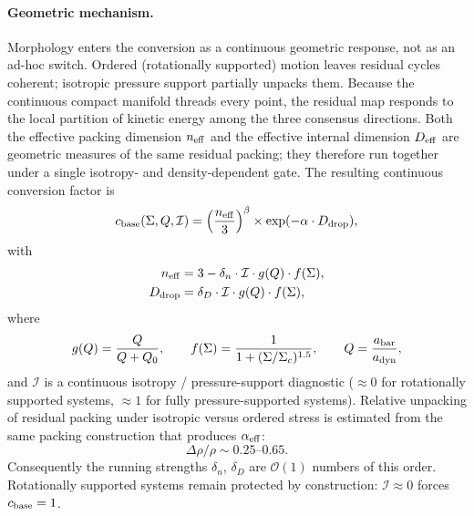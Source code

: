 \documentclass[11pt,a4paper]{article}
\begin{document}
\paragraph{Geometric mechanism.}
Morphology enters the conversion as a continuous geometric response, not as an ad-hoc switch. Ordered (rotationally supported) motion leaves residual cycles coherent; isotropic pressure support partially unpacks them. Because the continuous compact manifold threads every point, the residual map responds to the local partition of kinetic energy among the three consensus directions. Both the effective packing dimension \(n_{\rm eff}\) and the effective internal dimension \(D_{\rm eff}\) are geometric measures of the same residual packing; they therefore run together under a single isotropy- and density-dependent gate. The resulting continuous conversion factor is
\begin{equation}
c_{\rm base}(\Sigma,Q,\mathcal{I})
=
\Bigl(\frac{n_{\rm eff}}{3}\Bigr)^{\beta}
\times
\exp(-\alpha\cdot D_{\rm drop}),
\label{eq:c-base}
\end{equation}
with
\begin{align}
n_{\rm eff}&=3-\delta_n\cdot\mathcal{I}\cdot g(Q)\cdot f(\Sigma),
\label{eq:n-eff}\\
D_{\rm drop}&=\delta_D\cdot\mathcal{I}\cdot g(Q)\cdot f(\Sigma),
\label{eq:D-drop}
\end{align}
where
\[
g(Q)=\frac{Q}{Q+Q_0},\qquad
f(\Sigma)=\frac{1}{1+(\Sigma/\Sigma_c)^{1.5}},
\qquad
Q=\frac{a_{\rm bar}}{a_{\rm dyn}},
\]
and \(\mathcal{I}\) is a continuous isotropy / pressure-support diagnostic (\(\approx0\) for rotationally supported systems, \(\approx1\) for fully pressure-supported systems). Relative unpacking of residual packing under isotropic versus ordered stress is estimated from the same packing construction that produces \(\alpha_{\rm eff}\):
\[
\Delta\rho/\rho\sim0.25\text{--}0.65.
\]
Consequently the running strengths \(\delta_n\), \(\delta_D\) are \(\mathcal{O}(1)\) numbers of this order. Rotationally supported systems remain protected by construction: \(\mathcal{I}\approx0\) forces \(c_{\rm base}=1\).
\end{document}
